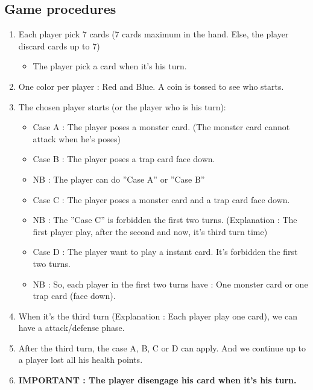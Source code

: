 \documentclass[a4paper,12pt]{book}
\begin{document}
\subsection{Game procedures}
\begin{enumerate}
	\item Each player pick 7 cards (7 cards maximum in the hand. Else, the player discard cards up to 7)
	\begin{itemize}
		\item The player pick a card when it's his turn.
	\end{itemize}
		\item One color per player : Red and Blue. A coin is tossed to see who starts.
		\item The chosen player starts (or the player who is his turn):
	\begin{itemize}
		\item Case A : The player poses a monster card. (The monster card cannot attack when he's poses)
		\item Case B : The player poses a trap card face down.
		\item NB : The player can do ''Case A'' or ''Case B''
		\item Case C : The player poses a monster card and a trap card face down.
		\item NB : The ''Case C'' is forbidden the first two turns. (Explanation : The first player play, after the second and now, it's third turn time)
		\item Case D : The player want to play a instant card. It's forbidden the first two turns.
		\item NB : So, each player in the first two turns have : One monster card or one trap card (face down).
	\end{itemize}
	\item When it's the third turn (Explanation : Each player play one card), we can have a attack/defense phase.
\item After the third turn, the case A, B, C or D can apply. And we continue up to a player lost all his health points.
\item \textbf{IMPORTANT : The player disengage his card when it's his turn.}
\end{enumerate}
\end{document}
